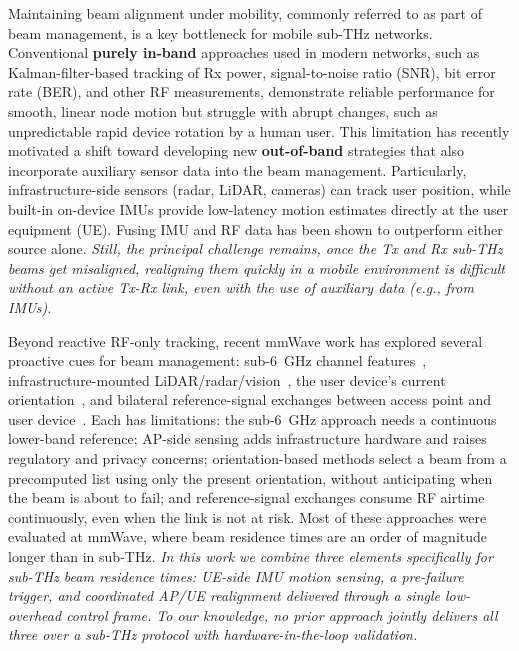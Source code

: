 \documentclass[fleqn,10pt]{wlscirep}
\newcommand{\rev}[1]{{\color{revblue}#1}}
\begin{document}
Maintaining beam alignment under mobility, commonly referred to as part of beam management, is a key bottleneck for mobile sub-THz networks\cite{Giordani2018ATO, 10422712, Wang2022}. Conventional \textbf{purely in-band} approaches used in modern networks, such as Kalman-filter-based tracking of Rx power, signal-to-noise ratio (SNR), bit error rate (BER), and other RF measurements\cite{8455289,9145366,10067030, 10123123}, demonstrate reliable performance for smooth, linear node motion but struggle with abrupt changes, such as unpredictable rapid device rotation by a human user\cite{Wang2022}. This limitation has recently motivated a shift toward developing new \textbf{out-of-band} strategies that also incorporate auxiliary sensor data into the beam management\cite{10494372, Azari2022, Nokia2022, Chen2023, Jornet2023}. Particularly, infrastructure-side sensors (radar, LiDAR, cameras) can track user position\cite{10422712,5GPPP_Automotive_Vision_2015}, while built-in on-device IMUs provide low-latency motion estimates directly at the user equipment (UE). Fusing IMU and RF data has been shown to outperform either source alone\cite{10036372,9391649,electronics8020142, s21082723, 9814507}. \emph{Still, the principal challenge remains, once the Tx and Rx sub-THz beams get misaligned, realigning them quickly in a mobile environment is difficult without an active Tx-Rx link, even with the use of auxiliary data (e.g., from IMUs).}

\rev{Beyond reactive RF-only tracking, recent mmWave work has explored several proactive cues for beam management: sub-6~GHz channel features~\cite{Alrabeiah2020DeepLearning}, infrastructure-mounted LiDAR/radar/vision~\cite{Alkhateeb2023DeepSense, Jiang2023LiDAR, Morais2023Position}, the user device's current orientation~\cite{Rezaie2022Orientation, Struye2023CoVRage}, and bilateral reference-signal exchanges between access point and user device~\cite{Alkhateeb2018DLCB, Xue2023Standardization, Heng2021SixChallenges}. Each has limitations: the sub-6~GHz approach needs a continuous lower-band reference; AP-side sensing adds infrastructure hardware and raises regulatory and privacy concerns; orientation-based methods select a beam from a precomputed list using only the present orientation, without anticipating when the beam is about to fail; and reference-signal exchanges consume RF airtime continuously, even when the link is not at risk. Most of these approaches were evaluated at mmWave, where beam residence times are an order of magnitude longer than in sub-THz. \emph{In this work we combine three elements specifically for sub-THz beam residence times: UE-side IMU motion sensing, a pre-failure trigger, and coordinated AP/UE realignment delivered through a single low-overhead control frame. To our knowledge, no prior approach jointly delivers all three over a sub-THz protocol with hardware-in-the-loop validation.}}
\end{document}
